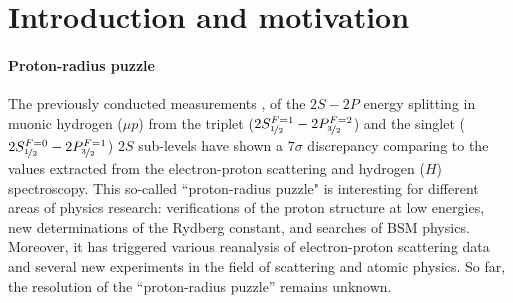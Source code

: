 \documentclass[12pt]{article}
\begin{document}
\section{Introduction and motivation}
\paragraph{Proton-radius puzzle}
The previously conducted measurements \cite{spectroscopy}, \cite{lambshift} of the $2S - 2P$ energy splitting in muonic hydrogen ($\mu{p}$) from the triplet ($2S_{\nicefrac{1}{2}}^{F=1} - 2P_{\nicefrac{3}{2}}^{F=2}$) and the singlet ($2S_{\nicefrac{1}{2}}^{F=0} - 2P_{\nicefrac{3}{2}}^{F=1}$) $2S$ sub-levels have shown a $7{\sigma}$ discrepancy comparing to the values extracted from the electron-proton scattering and hydrogen ($H$) spectroscopy. This so-called ``proton-radius puzzle" is interesting for different areas of physics research: verifications of the proton structure at low energies, new determinations of the Rydberg constant, and searches of BSM physics. Moreover, it has triggered various reanalysis of electron-proton scattering data and several new experiments in the field of scattering and atomic physics. So far, the resolution of the ``proton-radius puzzle'' remains unknown.
\end{document}
